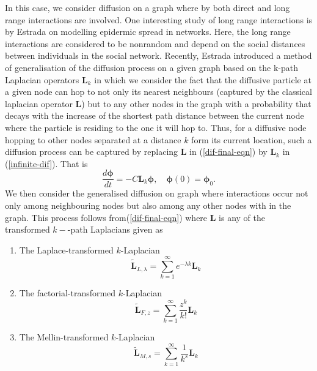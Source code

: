 \documentclass[10pt,a4paper]{article}
\begin{document}
    	   	In this case, we consider diffusion on a graph where by both direct and long range interactions are involved. One interesting study of long range interactions is by Estrada on modelling epidermic spread in networks. Here, the long range interactions are considered to be nonrandom and depend on the social distances between individuals in the social network.
    	    Recently, Estrada introduced a method of generalisation of the diffusion process on a given graph based on the k-path Laplacian operators $\mathbf{L}_k$ in which we consider the fact that the diffusive particle at a given node can hop to not only its nearest neighbours (captured by the classical laplacian operator $\mathbf{L}$) but to any other nodes in the graph with a probability that decays with the increase of the shortest path distance between the current node where the particle is residing to the one it will hop to. Thus, for a diffusive node hopping to other nodes separated at a distance $k$ form its current location, such a diffusion process can be captured by replacing $\mathbf{L}$ in (\ref{dif-final-eqn}) by $\mathbf{L}_k$ in (\ref{infinite-dif}). That is 
    	    \begin{equation}
    	    \frac{d\boldsymbol{\phi}}{dt} = -C\mathbf{L}_{k}\boldsymbol{\phi}, \quad \boldsymbol{\phi}(0) = \boldsymbol{\phi}_0 .
    	    \label{gen-difeqn}
    	    \end{equation}
    	    We then consider the generalised diffusion on graph where interactions occur not only among neighbouring nodes but also among any other nodes with in the graph. This process follows from(\ref{dif-final-eqn}) where $\mathbf{L}$ is any of the transformed $k-$-path Laplacians given as
    	    \begin{enumerate}
    	    	\item The Laplace-transformed $k$-Laplacian
    	    	\begin{equation}
    	    	\tilde{\mathbf{L}}_{L,\lambda} = \sum_{k=1}^{\infty} e^{-\lambda k} \mathbf{L}_k 
    	    	\end{equation}
    	    	\item The factorial-transformed $k$-Laplacian
    	    	\begin{equation}
    	    	\tilde{\mathbf{L}}_{F,z} = \sum_{k=1}^{\infty} \frac{z^k}{k!} \mathbf{L}_k 
    	    	\end{equation}
    	    	\item The Mellin-transformed $k$-Laplacian
    	    	\begin{equation}
    	    	\tilde{\mathbf{L}}_{M,s} = \sum_{k=1}^{\infty} \frac{1}{k^s} \mathbf{L}_k 
    	    	\end{equation}
    	    \end{enumerate}
       
\end{document}
